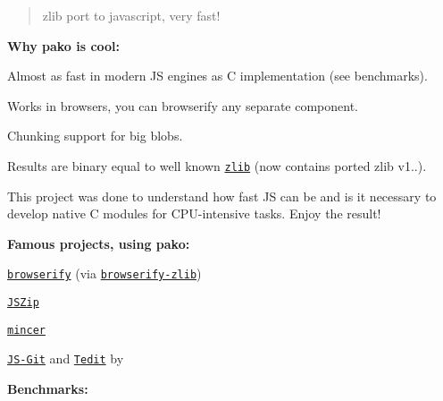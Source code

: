\href{https://travis-ci.org/nodeca/pako}{\tt } \href{https://www.npmjs.org/package/pako}{\tt }

\begin{quote}
zlib port to javascript, very fast! \end{quote}


{\bfseries Why pako is cool\+:}


\begin{DoxyItemize}
\item Almost as fast in modern JS engines as C implementation (see benchmarks).
\item Works in browsers, you can browserify any separate component.
\item Chunking support for big blobs.
\item Results are binary equal to well known \href{http://www.zlib.net/}{\tt zlib} (now contains ported zlib v1..).
\end{DoxyItemize}

This project was done to understand how fast JS can be and is it necessary to develop native C modules for C\+P\+U-\/intensive tasks. Enjoy the result!

{\bfseries Famous projects, using pako\+:}


\begin{DoxyItemize}
\item \href{http://browserify.org/}{\tt browserify} (via \href{https://github.com/devongovett/browserify-zlib}{\tt browserify-\/zlib})
\item \href{http://stuk.github.io/jszip/}{\tt J\+S\+Zip}
\item \href{https://github.com/nodeca/mincer}{\tt mincer}
\item \href{https://github.com/creationix/js-git}{\tt J\+S-\/\+Git} and \href{https://chrome.google.com/webstore/detail/tedit-development-environ/ooekdijbnbbjdfjocaiflnjgoohnblgf}{\tt Tedit} by \href{https://github.com/creationix}{\tt }
\end{DoxyItemize}

{\bfseries Benchmarks\+:}


